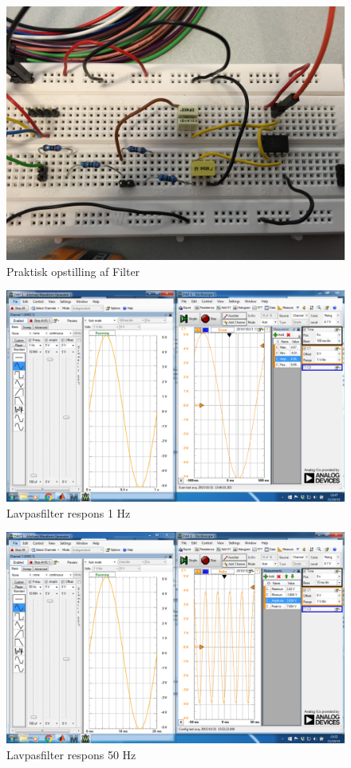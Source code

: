 \begin{figure}[H]
	\centering
	\includegraphics[width=1\textwidth]{Figurer/Filterblok}
	\caption{Praktisk opstilling af Filter}
	\label{fig:Filter}
\end{figure}

\begin{figure}[H]
	\centering
	\includegraphics[width=1\textwidth]{Figurer/Lavpasfilter_Praktisk_1Hz}
	\caption{Lavpasfilter respons 1 Hz}
	\label{fig:Filter}
\end{figure}

\begin{figure}[H]
	\centering
	\includegraphics[width=1\textwidth]{Figurer/Lavpasfilter_Praktisk_50Hz}
	\caption{Lavpasfilter respons 50 Hz}
	\label{fig:Filter}
\end{figure}

